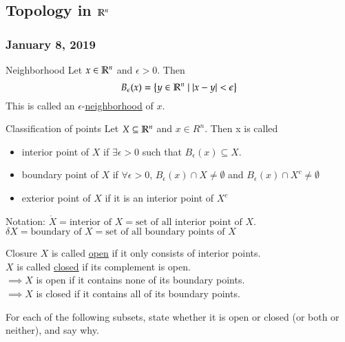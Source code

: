 \subsection{Topology in $\mathbb{R}^n$}
\subsubsection*{January 8, 2019}

\begin{defn}{Neighborhood}
  Let $x\in \mathbb{R}^n$ and $\epsilon > 0$. Then
  \begin{equation}
  	B_\epsilon (x) = \left\{ y\in \mathbb{R}^n \mid |x-y|<\epsilon \right\}
  \end{equation}
  This is called an $\epsilon$-\ul{neighborhood} of $x$.
\end{defn}
\begin{defn}{Classification of points}
  Let $X\subseteq \mathbb{R}^n$ and $x\in R^n$. Then x is called
  \begin{itemize}
    \item interior point of $X$ if $\exists \epsilon > 0$ such that $B_\epsilon (x) \subseteq X$.
    \item boundary point of $X$ if $\forall \epsilon > 0$, $B_\epsilon (x) \cap X \neq \emptyset$ and $B_\epsilon (x) \cap X^c \neq \emptyset$
    \item exterior point of $X$ if it is an interior point of $X^c$
  \end{itemize}
  Notation: $\mathring{X} = \text{interior of }X = \text{set of all interior point of }X$.
  $\delta X = \text{boundary of }X = \text{set of all boundary points of }X$
\end{defn}
\begin{defn}{Closure}
  $X$ is called \ul{open} if it only consists of interior points. \\
  $X$ is called \ul{closed} if its complement is open. \\
  $\implies X$ is open if it contains none of its boundary points. \\
  $\implies X$ is closed if it contains all of its boundary points. 
\end{defn}

For each of the following subsets, state whether it is open or closed (or both or neither), and say why.

